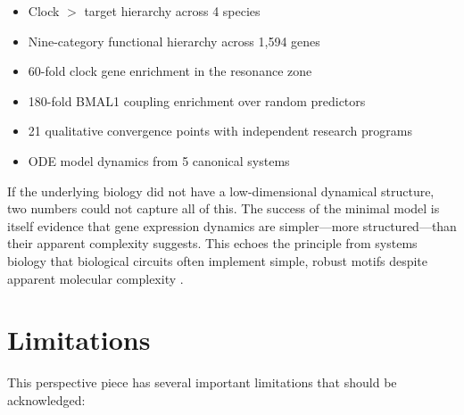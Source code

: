 \documentclass[11pt,letterpaper]{article}
\begin{document}
\begin{itemize}
\item Clock $>$ target hierarchy across 4 species
\item Nine-category functional hierarchy across 1,594 genes
\item 60-fold clock gene enrichment in the resonance zone
\item 180-fold BMAL1 coupling enrichment over random predictors
\item 21 qualitative convergence points with independent research programs
\item ODE model dynamics from 5 canonical systems
\end{itemize}

If the underlying biology did not have a low-dimensional dynamical structure, two numbers could not capture all of this. The success of the minimal model is itself evidence that gene expression dynamics are simpler---more structured---than their apparent complexity suggests. This echoes the principle from systems biology that biological circuits often implement simple, robust motifs despite apparent molecular complexity \citep{alon2006introduction, stelling2004robustness}.

\section{Limitations}

This perspective piece has several important limitations that should be acknowledged:
\end{document}
